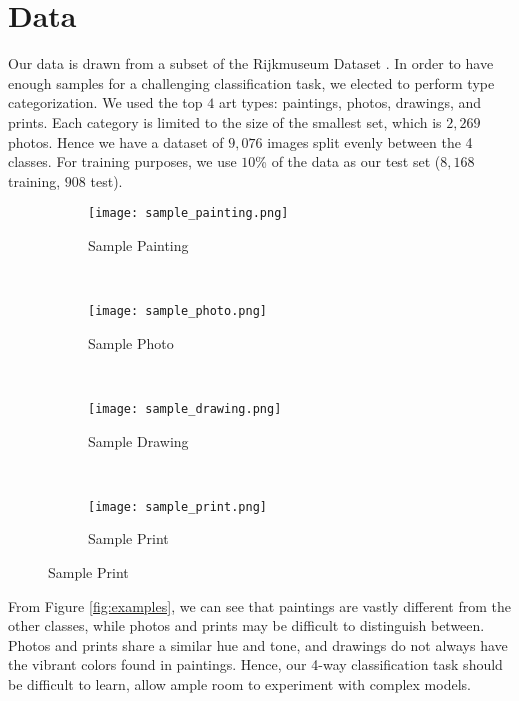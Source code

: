 \documentclass{article}
\begin{document}


\section{Data}
\label{sec:data}
Our data is drawn from a subset of the Rijkmuseum Dataset \cite{Rijksmuseum}.
In order to have enough samples for a challenging classification task, we
elected to perform type categorization. We used the top $4$ art types: paintings,
photos, drawings, and prints. Each category is limited to the size of the
smallest set, which is $2,269$ photos. Hence we have a dataset of $9,076$ images
split evenly between the 4 classes. For training purposes, we use $10$\% of the
data as our test set ($8,168$ training, $908$ test).

 \begin{figure}[h!]
   \caption{Class Examples}
   \label{fig:examples}
   \begin{subfigure}[b]{0.23\textwidth}
     \centering
     \texttt{[image: sample\_painting.png]}
     \caption{Sample Painting}
     \label{fig:painting}
   \end{subfigure}
   ~
   \begin{subfigure}[b]{0.23\textwidth}
     \centering
     \texttt{[image: sample\_photo.png]}
     \caption{Sample Photo}
     \label{fig:photo}
   \end{subfigure}
   ~
   \begin{subfigure}[b]{0.23\textwidth}
     \centering
     \texttt{[image: sample\_drawing.png]}
     \caption{Sample Drawing}
     \label{fig:drawing}
   \end{subfigure}
   ~
   \begin{subfigure}[b]{0.23\textwidth}
     \centering
     \texttt{[image: sample\_print.png]}
     \caption{Sample Print}
     \label{fig:print}
   \end{subfigure}
 \end{figure}

From Figure \ref{fig:examples}, we can see that paintings are vastly different
from the other classes, while photos and prints may be difficult to distinguish
between. Photos and prints share a similar hue and tone, and drawings do not
always have the vibrant colors found in paintings. Hence, our 4-way
classification task should be difficult to learn, allow ample room to experiment
with complex models.
\end{document}
